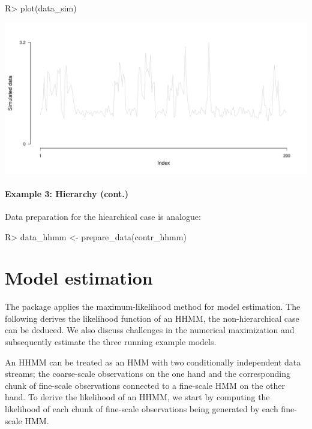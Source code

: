 \documentclass[article]{jss}
\begin{document}
%
\begin{Schunk}
\begin{Sinput}
R> plot(data_sim)
\end{Sinput}
\end{Schunk}
\includegraphics{fhmm_oelschlaeger_adam_michels-sim-data-ts}
%

\paragraph{Example 3: Hierarchy (cont.)}

Data preparation for the hiearchical case is analogue:

%
\begin{Schunk}
\begin{Sinput}
R> data_hhmm <- prepare_data(contr_hhmm)
\end{Sinput}
\end{Schunk}
%

\section{Model estimation} \label{sec:model_estimation} %

The  package applies the maximum-likelihood method for model estimation. The following derives the likelihood function of an HHMM, the non-hierarchical case can be deduced. We also discuss challenges in the numerical maximization and subsequently estimate the three running example models.

An HHMM can be treated as an HMM with two conditionally independent data streams; the coarse-scale observations on the one hand and the corresponding chunk of fine-scale observations connected to a fine-scale HMM on the other hand. To derive the likelihood of an HHMM, we start by computing the likelihood of each chunk of fine-scale observations being generated by each fine-scale HMM. 
\end{document}
